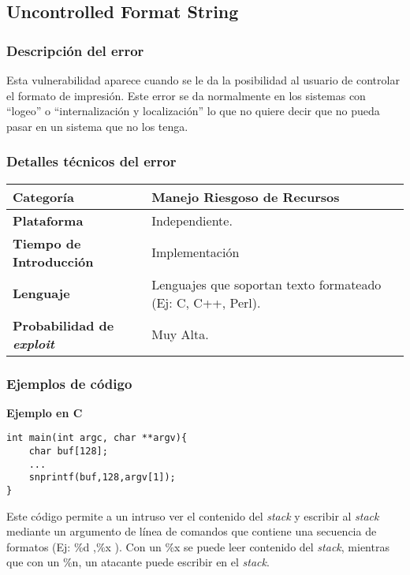 \subsection{Uncontrolled Format String}

\subsubsection{Descripción del error}

Esta vulnerabilidad aparece cuando se le da la posibilidad al usuario de controlar el formato de impresión.
Este error se da normalmente en los sistemas con ``logeo'' o ``internalización y localización'' lo que no quiere decir que no pueda pasar en un sistema que no los tenga.


\subsubsection{Detalles técnicos del error}
\begin{tabular}[\baselineskip]{|l|p{7cm}|}
  \hline
  \textbf{Categoría} & Manejo Riesgoso de Recursos \\
  \hline
  \textbf{Plataforma} & Independiente. \\
  \hline
  \textbf{Tiempo de Introducción} & Implementación \\
  \hline
  \textbf{Lenguaje} & Lenguajes que soportan texto formateado (Ej: C, C++, Perl). \\
  \hline
  \textbf{Probabilidad de \emph{exploit}} & Muy Alta. \\
  \hline
\end{tabular}

\subsubsection{Ejemplos de código}

\noindent \textbf{Ejemplo en C}\\

\begin{lstlisting}[frame=single]
int main(int argc, char **argv){
	char buf[128];
	...
	snprintf(buf,128,argv[1]);
}
\end{lstlisting}
Este código permite a un intruso ver el contenido del \textit{stack} y escribir al \textit{stack} mediante un argumento de línea de
comandos que contiene una secuencia de formatos (Ej: \%d ,\%x ).
Con un \%x se puede leer contenido del \textit{stack}, mientras que con un \%n, un atacante puede escribir en el \textit{stack}.

